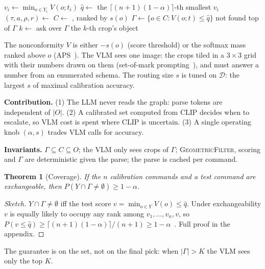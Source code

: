 \documentclass[conference]{IEEEtran}
\newtheorem{theorem}{Theorem}
\newcommand{\cset}{\Gamma}
\begin{document}
\begin{algorithm}[t]
\caption{Conformal routing}\label{alg:route}
\begin{algorithmic}[1]
    \State $v_i\gets\min_{o\in Y_i}V(o;t_i)$ 
  \EndFor
  \State \Return $\hat q\gets$ the $\lceil(n+1)(1-\alpha)\rceil$-th smallest $v_i$
\EndFunction
{}
  \State $(\tau,a,\rho,r)\gets$  
  \State $C\gets$ , ranked by $s(o)$
  \State $\cset\gets\{o\in C: V(o;t)\le\hat q\}$
  \If{$\cset=\emptyset$} \Return not found \EndIf
  \If{$|\cset|\le s$} \Return top of $\cset$ \EndIf
  \State $k\gets$ \Call{VLM}{grid of the top $K$ crops of $\cset$, $t$}
   \Return ask over $\cset$ \EndIf
  \State \Return the $k$-th crop's object
\EndFunction
\end{algorithmic}
\end{algorithm}

The nonconformity $V$ is either $-s(o)$ (score threshold) or the softmax mass ranked above $o$ (APS~\cite{romano2020aps}).
The VLM sees one image: the crops tiled in a $3\times3$ grid with their numbers drawn on them (set-of-mark
prompting~\cite{yang2023som}), and must answer a number from an enumerated schema. The routing size $s$ is tuned on
$\mathcal{D}$: the largest $s$ of maximal calibration accuracy.

\textbf{Contribution.} (1) The LLM never reads the graph: parse tokens are independent of $|O|$. (2) A calibrated
set computed from CLIP decides when to escalate, so VLM cost is spent where CLIP is uncertain. (3) A single
operating knob $(\alpha,s)$ trades VLM calls for accuracy.

\textbf{Invariants.} $\cset\subseteq C\subseteq O$; the VLM only sees crops of $\cset$; \textsc{GeometricFilter},
scoring and $\cset$ are deterministic given the parse; the parse is cached per command.

\begin{theorem}[Coverage]
If the $n$ calibration commands and a test command are exchangeable, then
$P(Y\cap\cset\neq\emptyset)\ge 1-\alpha$.
\end{theorem}
\begin{proof}[Sketch]
$Y\cap\cset\neq\emptyset$ iff the test score $v=\min_{o\in Y}V(o)\le\hat q$. Under exchangeability $v$ is
equally likely to occupy any rank among $v_1,\dots,v_n,v$, so
$P(v\le\hat q)\ge\lceil(n+1)(1-\alpha)\rceil/(n+1)\ge 1-\alpha$~\cite{vovk2005algorithmic}. Full proof in the appendix.
\end{proof}
The guarantee is on the set, not on the final pick: when $|\cset|>K$ the VLM sees only the top $K$.
\end{document}
